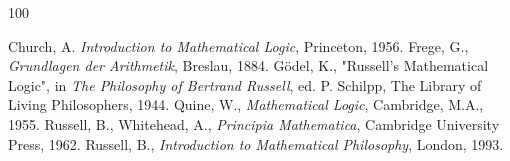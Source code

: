 \documentclass[12pt]{article}
\begin{document}
\begin{thebibliography} {100}

 Church, A. \emph{Introduction to Mathematical Logic}, Princeton, 1956.
 Frege, G., \emph{Grundlagen der Arithmetik}, Breslau, 1884.
 G\"{o}del, K., "Russell's Mathematical Logic", in \emph{The Philosophy of Bertrand Russell}, ed. P. Schilpp, The Library of Living Philosophers, 1944.
 Quine, W., \emph{Mathematical Logic}, Cambridge, M.A., 1955.
 Russell, B., Whitehead, A., \emph{Principia Mathematica}, Cambridge University Press, 1962.
 Russell, B., \emph{Introduction to Mathematical Philosophy}, London, 1993.
\end{thebibliography}
\end{document}
